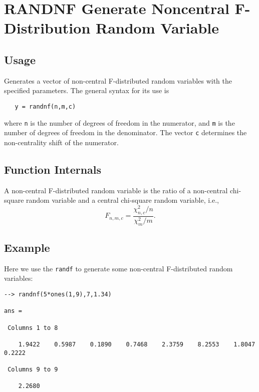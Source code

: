 \section{RANDNF Generate Noncentral F-Distribution Random Variable}

\subsection{Usage}

Generates a vector of non-central F-distributed random variables
with the specified parameters.  The general syntax for its use is
\begin{verbatim}
   y = randnf(n,m,c)
\end{verbatim}
where \verb|n| is the number of degrees of freedom in the numerator,
and \verb|m| is the number of degrees of freedom in the denominator.
The vector \verb|c| determines the non-centrality shift of the numerator.
\subsection{Function Internals}

A non-central F-distributed random variable is the ratio of a
non-central chi-square random variable and a central chi-square random
variable, i.e.,
\[
   F_{n,m,c} = \frac{\chi_{n,c}^2/n}{\chi_m^2/m}.
\]
\subsection{Example}

Here we use the \verb|randf| to generate some non-central F-distributed
random variables:
\begin{verbatim}
--> randnf(5*ones(1,9),7,1.34)

ans = 

 Columns 1 to 8

    1.9422    0.5987    0.1890    0.7468    2.3759    8.2553    1.8047    0.2222 

 Columns 9 to 9

    2.2680 
\end{verbatim}
